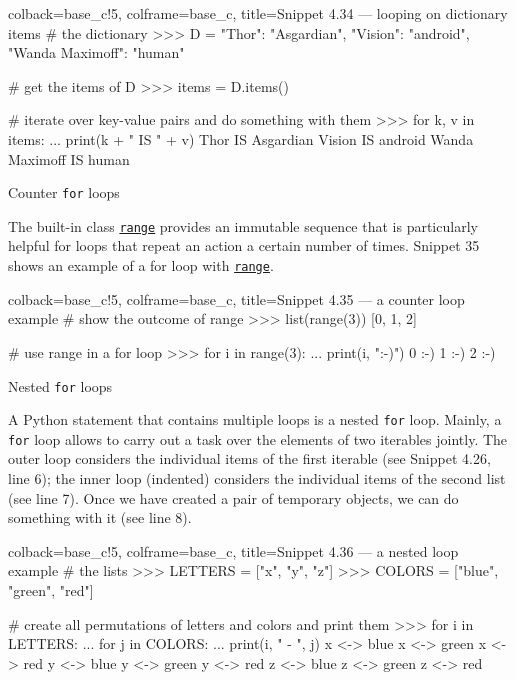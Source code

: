 \documentclass[a4paper,11pt]{book}
\numberwithin{figure}{chapter}
\numberwithin{table}{chapter}
\newcommand{\question}[1]{%
    \begin{tcolorbox}[colback=comp_c!10,colframe=comp_c,sidebyside align=top,width=\linewidth,before skip=1ex]
        #1
    \end{tcolorbox}
    \switchcolumn%
}
\newcommand{\note}[1]{%
    \begin{tcolorbox}[colback=white!0,colframe=white!10,width=\linewidth,before skip=1ex]
        #1
    \end{tcolorbox}
}
\begin{document}
\begin{pythoncode}[linenos=true,]{colback=base_c!5, colframe=base_c, title=\sffamily Snippet 4.34 --- looping on dictionary items}
# the dictionary
>>> D = {"Thor": "Asgardian", "Vision": "android", "Wanda Maximoff": "human"}

# get the items of D
>>> items = D.items()

# iterate over key-value pairs and do something with them
>>> for k, v in items:
...    print(k + " IS " + v)
Thor IS Asgardian
Vision IS android
Wanda Maximoff IS human
\end{pythoncode}
\clearpage

\begin{paracol}{2}
	\question{\raggedright Counter \texttt{for} loops}
	\note{The built-in class \href{https://docs.python.org/3/library/functions.html\#func-range}{\texttt{range}} provides an immutable sequence that is particularly helpful for loops that repeat an action a certain number of times. Snippet 35 shows an example of a for loop with \href{https://docs.python.org/3/library/functions.html\#func-range}{\texttt{range}}.}
\end{paracol}

\begin{pythoncode}[linenos=true,]{colback=base_c!5, colframe=base_c, title=\sffamily Snippet 4.35 --- a counter loop example}
# show the outcome of range
>>> list(range(3))
[0, 1, 2]

# use range in a for loop
>>> for i in range(3):
...     print(i, ":-)")
0 :-)
1 :-)
2 :-)
\end{pythoncode}

\begin{paracol}{2}
	\question{\raggedright Nested \texttt{for} loops}
    \note{A Python statement that contains multiple  loops is a nested \texttt{for} loop. Mainly, a
    \texttt{for} loop allows to carry out a task over the elements of two iterables jointly. The outer loop considers the individual items of the first iterable (see Snippet 4.26, line 6); the inner loop (indented) considers the individual items of the second list (see line 7). Once we have created a pair of temporary objects, we can do something with it (see line 8).}
\end{paracol}

\begin{pythoncode}[linenos=true,]{colback=base_c!5, colframe=base_c, title=\sffamily Snippet 4.36 --- a nested loop example}
# the lists
>>> LETTERS = ["x", "y", "z"]
>>> COLORS = ["blue", "green", "red"]

# create all permutations of letters and colors and print them
>>> for i in LETTERS:
...     for j in COLORS:
...         print(i, " - ", j)
x  <->  blue
x  <->  green
x  <->  red
y  <->  blue
y  <->  green
y  <->  red
z  <->  blue
z  <->  green
z  <->  red
\end{pythoncode}
\clearpage
\end{document}
